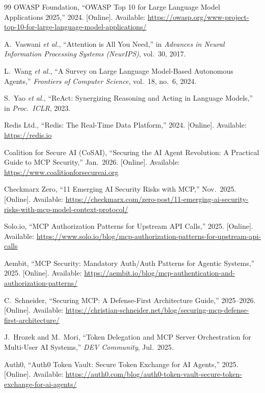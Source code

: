 \documentclass[journal]{IEEEtran}
\begin{document}
\begin{thebibliography}{99}
OWASP Foundation,
``OWASP Top 10 for Large Language Model Applications 2025,'' 2024.
[Online]. Available:
\url{https://owasp.org/www-project-top-10-for-large-language-model-applications/}

A.\ Vaswani \textit{et al.},
``Attention is All You Need,''
in \textit{Advances in Neural Information Processing Systems (NeurIPS)},
vol.\ 30, 2017.

L.\ Wang \textit{et al.},
``A Survey on Large Language Model-Based Autonomous Agents,''
\textit{Frontiers of Computer Science}, vol.\ 18, no.\ 6, 2024.

S.\ Yao \textit{et al.},
``ReAct: Synergizing Reasoning and Acting in Language Models,''
in \textit{Proc.\ ICLR}, 2023.

Redis Ltd., ``Redis: The Real-Time Data Platform,'' 2024.
[Online]. Available: \url{https://redis.io}

Coalition for Secure AI (CoSAI),
``Securing the AI Agent Revolution: A Practical Guide to MCP Security,''
Jan.\ 2026.
[Online]. Available: \url{https://www.coalitionforsecureai.org}

Checkmarx Zero,
``11 Emerging AI Security Risks with MCP,'' Nov.\ 2025.
[Online]. Available:
\url{https://checkmarx.com/zero-post/11-emerging-ai-security-risks-with-mcp-model-context-protocol/}

Solo.io,
``MCP Authorization Patterns for Upstream API Calls,'' 2025.
[Online]. Available:
\url{https://www.solo.io/blog/mcp-authorization-patterns-for-upstream-api-calls}

Aembit,
``MCP Security: Mandatory Auth/Auth Patterns for Agentic Systems,'' 2025.
[Online]. Available:
\url{https://aembit.io/blog/mcp-authentication-and-authorization-patterns/}

C.\ Schneider,
``Securing MCP: A Defense-First Architecture Guide,'' 2025--2026.
[Online]. Available:
\url{https://christian-schneider.net/blog/securing-mcp-defense-first-architecture/}

J.\ Hrozek and M.\ Mori,
``Token Delegation and MCP Server Orchestration for Multi-User AI Systems,''
\textit{DEV Community}, Jul.\ 2025.

Auth0,
``Auth0 Token Vault: Secure Token Exchange for AI Agents,'' 2025.
[Online]. Available:
\url{https://auth0.com/blog/auth0-token-vault-secure-token-exchange-for-ai-agents/}


\end{thebibliography}
\end{document}
